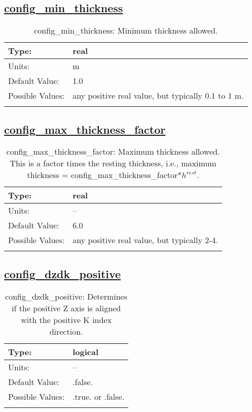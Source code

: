\subsection[config\_min\_thickness]{\hyperref[sec:nm_tab_ALE_vertical_grid]{config\_min\_thickness}}
\label{subsec:nm_sec_config_min_thickness}
\begin{center}
\begin{longtable}{| p{2.0in} || p{4.0in} |}
    \hline
    Type: & real \\
    \hline
    Units: & \si{m} \\
    \hline
    Default Value: & 1.0 \\
    \hline
    Possible Values: & any positive real value, but typically 0.1 to 1 m. \\
    \hline
    \caption{config\_min\_thickness: Minimum thickness allowed.}
\end{longtable}
\end{center}
\subsection[config\_max\_thickness\_factor]{\hyperref[sec:nm_tab_ALE_vertical_grid]{config\_max\_thickness\_factor}}
\label{subsec:nm_sec_config_max_thickness_factor}
\begin{center}
\begin{longtable}{| p{2.0in} || p{4.0in} |}
    \hline
    Type: & real \\
    \hline
    Units: & -- \\
    \hline
    Default Value: & 6.0 \\
    \hline
    Possible Values: & any positive real value, but typically 2-4. \\
    \hline
    \caption{config\_max\_thickness\_factor: Maximum thickness allowed. This is a factor times the resting thickness, i.e., maximum thickness = config\_max\_thickness\_factor*$h^{rest}$.}
\end{longtable}
\end{center}
\subsection[config\_dzdk\_positive]{\hyperref[sec:nm_tab_ALE_vertical_grid]{config\_dzdk\_positive}}
\label{subsec:nm_sec_config_dzdk_positive}
\begin{center}
\begin{longtable}{| p{2.0in} || p{4.0in} |}
    \hline
    Type: & logical \\
    \hline
    Units: & -- \\
    \hline
    Default Value: & .false. \\
    \hline
    Possible Values: & .true. or .false. \\
    \hline
    \caption{config\_dzdk\_positive: Determines if the positive Z axis is aligned with the positive K index direction.}
\end{longtable}
\end{center}
